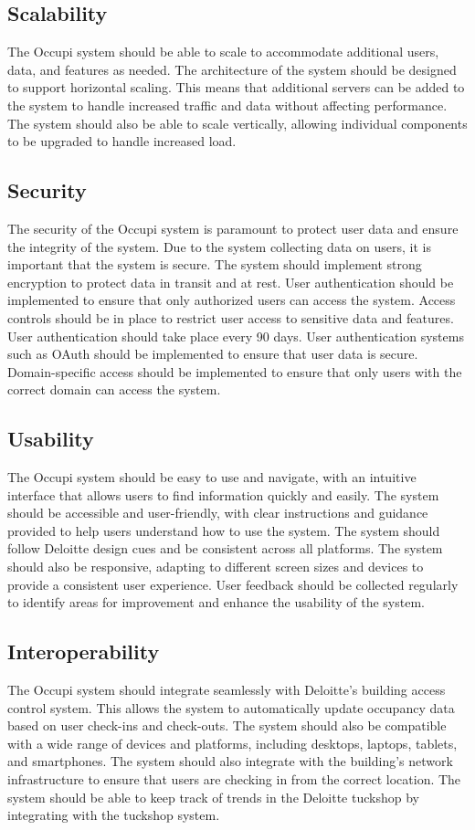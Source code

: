 \documentclass[11pt,a4paper]{article}
\begin{document}
\subsection*{Scalability}
The Occupi system should be able to scale to accommodate additional users, data, and features as needed. The architecture of the system should be designed to support horizontal scaling. This means that additional servers can be added to the system to handle increased traffic and data without affecting performance. The system should also be able to scale vertically, allowing individual components to be upgraded to handle increased load.

\subsection*{Security}
The security of the Occupi system is paramount to protect user data and ensure the integrity of the system. Due to the system collecting data on users, it is important that the system is secure. The system should implement strong encryption to protect data in transit and at rest. User authentication should be implemented to ensure that only authorized users can access the system. Access controls should be in place to restrict user access to sensitive data and features. User authentication should take place every 90 days. User authentication systems such as OAuth should be implemented to ensure that user data is secure. Domain-specific access should be implemented to ensure that only users with the correct domain can access the system.

\subsection*{Usability}
The Occupi system should be easy to use and navigate, with an intuitive interface that allows users to find information quickly and easily. The system should be accessible and user-friendly, with clear instructions and guidance provided to help users understand how to use the system. The system should follow Deloitte design cues and be consistent across all platforms. The system should also be responsive, adapting to different screen sizes and devices to provide a consistent user experience. User feedback should be collected regularly to identify areas for improvement and enhance the usability of the system.

\subsection*{Interoperability}
The Occupi system should integrate seamlessly with Deloitte’s building access control system. This allows the system to automatically update occupancy data based on user check-ins and check-outs. The system should also be compatible with a wide range of devices and platforms, including desktops, laptops, tablets, and smartphones. The system should also integrate with the building’s network infrastructure to ensure that users are checking in from the correct location. The system should be able to keep track of trends in the Deloitte tuckshop by integrating with the tuckshop system.
\end{document}
